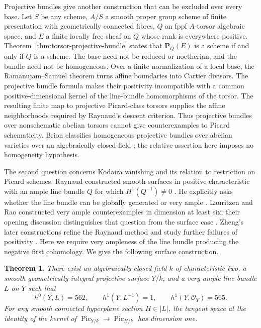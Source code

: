 \documentclass[11pt]{article}
\newtheorem{theorem}{Theorem}[section]
\theoremstyle{remark}\newtheorem{remark}[theorem]{Remark}
\newcommand{\OO}{\mathcal O}
\newcommand{\Pic}{\operatorname{Pic}}
\newcommand{\PP}{\mathbf P}
\begin{document}
Projective bundles give another construction that can be excluded over every base. Let $S$ be any scheme, $A/S$ a smooth proper group scheme of finite presentation with geometrically connected fibres, $Q$ an fppf $A$-torsor algebraic space, and $E$ a finite locally free sheaf on $Q$ whose rank is everywhere positive. Theorem~\ref{thm:torsor-projective-bundle} states that $\PP_Q(E)$ is a scheme if and only if $Q$ is a scheme. The base need not be reduced or noetherian, and the bundle need not be homogeneous. Over a finite normalization of a local base, the Ramanujam--Samuel theorem turns affine boundaries into Cartier divisors. The projective bundle formula makes their positivity incompatible with a common positive-dimensional kernel of the line-bundle homomorphisms of the torsor. The resulting finite map to projective Picard-class torsors supplies the affine neighborhoods required by Raynaud's descent criterion. Thus projective bundles over nonschematic abelian torsors cannot give counterexamples to Picard schematicity. Brion classifies homogeneous projective bundles over abelian varieties over an algebraically closed field \cite[pp.~2475--2479]{BrionProjective}; the relative assertion here imposes no homogeneity hypothesis.

The second question concerns Kodaira vanishing and its relation to restriction on Picard schemes. Raynaud constructed smooth surfaces in positive characteristic with an ample line bundle $Q$ for which $H^1(Q^{-1})\ne0$ \cite[pp.~273--278]{Raynaud}. He explicitly asks whether the line bundle can be globally generated or very ample \cite[\S3, Remark~3, p.~278]{Raynaud}. Lauritzen and Rao constructed very ample counterexamples in dimension at least six; their opening discussion distinguishes that question from the surface case \cite[pp.~1--2 of the author manuscript]{LR}. Zheng's later constructions refine the Raynaud method and study further failures of positivity \cite{Zheng}. Here we require very ampleness of the line bundle producing the negative first cohomology. We give the following surface construction.

\begin{theorem}\label{thm:surface}
There exist an algebraically closed field $k$ of characteristic two, a smooth geometrically integral projective surface $Y/k$, and a very ample line bundle $L$ on $Y$ such that
\[
 h^0(Y,L)=562,\qquad h^1(Y,L^{-1})=1,\qquad h^1(Y,\OO_Y)=565.
\]
For any smooth connected hyperplane section $H\in|L|$, the tangent space at the identity of the kernel of $\Pic_{Y/k}\to\Pic_{H/k}$ has dimension one.
\end{theorem}
\end{document}
